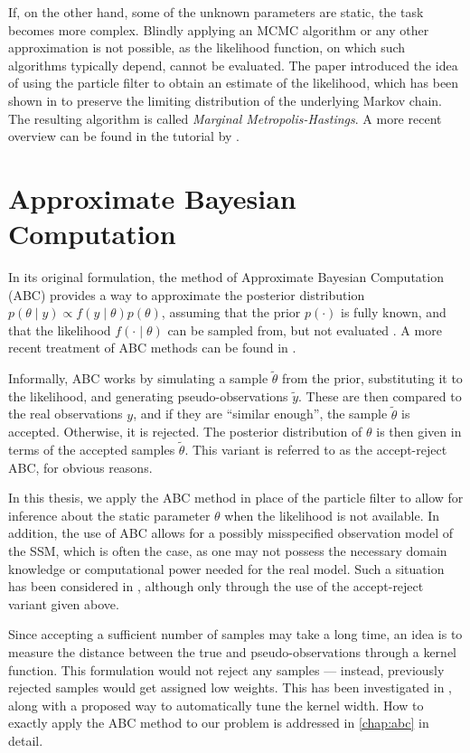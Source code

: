 If, on the other hand, some of the unknown parameters are static, the task becomes more complex. Blindly applying an MCMC algorithm or any other approximation is not possible, as the likelihood function, on which such algorithms typically depend, cannot be evaluated. The paper \cite{andrieu} introduced the idea of using the particle filter to obtain an estimate of the likelihood, which has been shown in \cite{del-moral} to preserve the limiting distribution of the underlying Markov chain. The resulting algorithm is called \textit{Marginal Metropolis-Hastings}. A more recent overview can be found in the tutorial by \cite{schoen}.

\section{Approximate Bayesian Computation}
In its original formulation, the method of Approximate Bayesian Computation (ABC) provides a way to approximate the posterior distribution $p(\theta \mid y) \propto f(y \mid \theta) p(\theta)$, assuming that the prior $p(\cdot)$ is fully known, and that the likelihood $f(\cdot \mid \theta)$ can be sampled from, but not evaluated \citep{abc-old-old, abc-old}. A more recent treatment of ABC methods can be found in \cite{abc-recent}.

Informally, ABC works by simulating a sample $\tilde{\theta}$ from the prior, substituting it to the likelihood, and generating pseudo-observations $\tilde{y}$. These are then compared to the real observations $y$, and if they are ``similar enough'', the sample $\tilde{\theta}$ is accepted. Otherwise, it is rejected. The posterior distribution of $\theta$ is then given in terms of the accepted samples $\tilde{\theta}$. This variant is referred to as the accept-reject ABC, for obvious reasons.

In this thesis, we apply the ABC method in place of the particle filter to allow for inference about the static parameter $\theta$ when the likelihood is not available. In addition, the use of ABC allows for a possibly misspecified observation model of the SSM, which is often the case, as one may not possess the necessary domain knowledge or computational power needed for the real model. Such a situation has been considered in \cite{jasra-time-series}, although only through the use of the accept-reject variant given above.

Since accepting a sufficient number of samples may take a long time, an idea is to measure the distance between the true and pseudo-observations through a kernel function. This formulation would not reject any samples --- instead, previously rejected samples would get assigned low weights. This has been investigated in \cite{dedecius}, along with a proposed way to automatically tune the kernel width. How to exactly apply the ABC method to our problem is addressed in \autoref{chap:abc} in detail.


